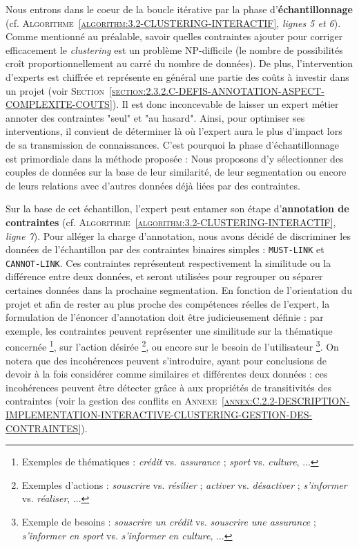 		Nous entrons dans le coeur de la boucle itérative par la phase d'\textbf{échantillonnage} (cf. \textsc{Algorithme~\ref{algorithm:3.2-CLUSTERING-INTERACTIF}}, \textit{lignes 5 et 6}).
		Comme mentionné au préalable, savoir quelles contraintes ajouter pour corriger efficacement le \textit{clustering} est un problème NP-difficile (le nombre de possibilités croît proportionnellement au carré du nombre de données).
		De plus, l'intervention d'experts est chiffrée et représente en général une partie des coûts à investir dans un projet (voir \textsc{Section~\ref{section:2.3.2.C-DEFIS-ANNOTATION-ASPECT-COMPLEXITE-COUTS}}).
		Il est donc inconcevable de laisser un expert métier annoter des contraintes "seul" et "au hasard".
		Ainsi, pour optimiser ses interventions, il convient de déterminer là où l'expert aura le plus d'impact lors de sa transmission de connaissances.
		C'est pourquoi la phase d'échantillonnage est primordiale dans la méthode proposée : Nous proposons d'y sélectionner des couples de données sur la base de leur similarité, de leur segmentation ou encore de leurs relations avec d'autres données déjà liées par des contraintes.
		
		Sur la base de cet échantillon, l'expert peut entamer son étape d'\textbf{annotation de contraintes} (cf. \textsc{Algorithme~\ref{algorithm:3.2-CLUSTERING-INTERACTIF}}, \textit{ligne 7}).
		Pour alléger la charge d'annotation, nous avons décidé de discriminer les données de l'échantillon par des contraintes binaires simples : \texttt{MUST-LINK} et \texttt{CANNOT-LINK}.
		Ces contraintes représentent respectivement la similitude ou la différence entre deux données, et seront utilisées pour regrouper ou séparer certaines données dans la prochaine segmentation.
		En fonction de l'orientation du projet et afin de rester au plus proche des compétences réelles de l'expert, la formulation de l'énoncer d'annotation doit être judicieusement définie : par exemple, les contraintes peuvent représenter une similitude
		sur la thématique concernée \footnote{
			Exemples de thématiques : \textit{crédit} vs. \textit{assurance} ; \textit{sport} vs. \textit{culture}, ...
		}, sur l'action désirée \footnote{
			Exemples d'actions : \textit{souscrire} vs. \textit{résilier} ; \textit{activer} vs. \textit{désactiver} ; \textit{s'informer} vs. \textit{réaliser}, ...
		}, ou encore sur le besoin de l'utilisateur \footnote{
			Exemple de besoins : \textit{souscrire un crédit} vs. \textit{souscrire une assurance} ; \textit{s'informer en sport} vs. \textit{s'informer en culture}, ...
		}.
		On notera que des incohérences peuvent s'introduire, ayant pour conclusions de devoir à la fois considérer comme similaires et différentes deux données : ces incohérences peuvent être détecter grâce à aux propriétés de transitivités des contraintes (voir la gestion des conflits en \textsc{Annexe~\ref{annex:C.2.2-DESCRIPTION-IMPLEMENTATION-INTERACTIVE-CLUSTERING-GESTION-DES-CONTRAINTES}}).
		
